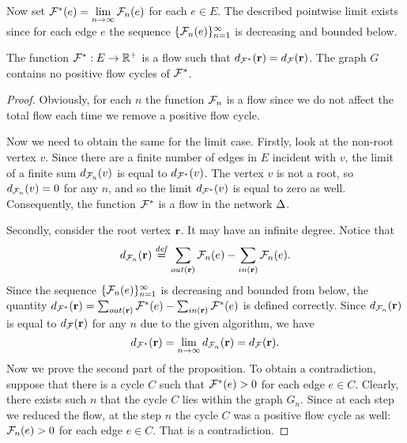 \documentclass[12pt,oneside,a4paper]{amsart}
\begin{document}
        Now set $\mathcal{F^{*}}(e) = \lim\limits_{n \to \infty} \mathcal{F}_{n}(e)$ for each $e \in E$.
        The described pointwise limit exists since for each edge $e$ the sequence $\{\mathcal{F}_{n}(e)\}_{n=1}^\infty$ is decreasing and bounded below.
        \begin{prop}
          The function $\mathcal{F^{*}}: E \to \mathbb{R}^+$ is a flow such that $d_{\mathcal{F^{*}}}(\mathbf{r}) = d_{\mathcal{F}}(\mathbf{r})$.
          The graph $G$ contains no positive flow cycles of $\mathcal{F^{*}}$.
        \end{prop}
        \begin{proof}
          Obviously, for each $n$ the function $\mathcal{F}_{n}$ is a flow since we do not affect the total flow each time we remove a positive flow cycle.

          Now we need to obtain the same for the limit case.
          Firstly, look at the non-root vertex $v$.
          Since there are a finite number of edges in $E$ incident with $v$, the limit of
            a finite sum $d_{\mathcal{F}_{n}}(v)$ is equal to $d_{\mathcal{F^{*}}}(v)$.
          The vertex $v$ is not a root, so $d_{\mathcal{F}_{n}}(v) = 0$ for any $n$, and so the limit $d_{\mathcal{F^{*}}}(v)$ is equal to zero as well.
          Consequently, the function $\mathcal{F^{*}}$ is a flow in the network $\Delta$.

          Secondly, consider the root vertex $\mathbf{r}$.
          It may have an infinite degree.
          Notice that
          \[
            d_{\mathcal{F}_{n}}(\mathbf{r}) \overset{\mathit{def}}{=} \sum_{out(\mathbf{r})} \mathcal{F}_{n}(e) - \sum_{in(\mathbf{r})} \mathcal{F}_{n}(e).
          \]
          Since the sequence $\{\mathcal{F}_{n}(e)\}_{n=1}^\infty$ is decreasing and bounded from below,
            the quantity $d_{\mathcal{F^{*}}}(\mathbf{r})=\sum_{out(\mathbf{r})} \mathcal{F^{*}}(e) - \sum_{in(\mathbf{r})} \mathcal{F^{*}}(e)$ is defined correctly.
          Since $d_{\mathcal{F}_{n}}(\mathbf{r})$ is equal to $d_{\mathcal{F}}(\mathbf{r})$ for any $n$ due to the given algorithm, we have
          \[
            d_{\mathcal{F^{*}}}(\mathbf{r}) = \lim_{n \to \infty} d_{\mathcal{F}_{n}}(\mathbf{r}) = d_{\mathcal{F}}(\mathbf{r}).
          \]
          Now we prove the second part of the proposition.
          To obtain a contradiction, suppose that there is a cycle $C$ such that $\mathcal{F^{*}}(e) > 0$ for
            each edge $e \in C$.
          Clearly, there exists such $n$ that the cycle $C$ lies within the graph $G_n$.
          Since at each step we reduced the flow, at the step $n$
            the cycle $C$ was a positive flow cycle as well: $\mathcal{F}_{n}(e) > 0$ for each edge $e \in C$.
          That is a contradiction.
        \end{proof}
\end{document}
